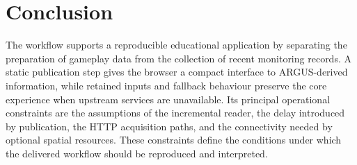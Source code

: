 \documentclass[10pt,a4paper]{article}
\begin{document}


\section{Conclusion}
The workflow supports a reproducible educational application by separating the preparation of gameplay data from the collection of recent monitoring records. A static publication step gives the browser a compact interface to ARGUS-derived information, while retained inputs and fallback behaviour preserve the core experience when upstream services are unavailable. Its principal operational constraints are the assumptions of the incremental reader, the delay introduced by publication, the HTTP acquisition paths, and the connectivity needed by optional spatial resources. These constraints define the conditions under which the delivered workflow should be reproduced and interpreted.
\end{document}
